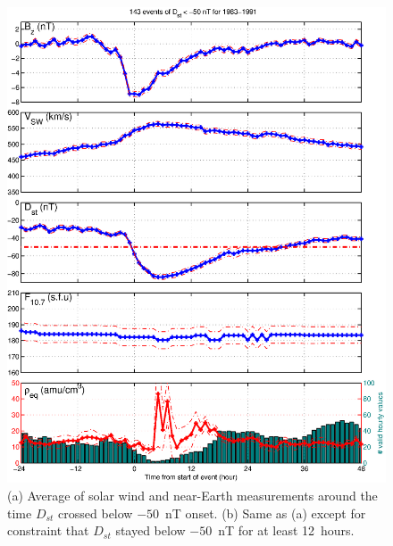 \documentclass[10pt,twocolumn]{article}
\begin{document}
\begin{figure}[tp!]
\includegraphics[scale=0.40]{paperfigures/stormavs-dd12.eps}
\caption{(a) Average of solar wind and near-Earth measurements around the time $D_{st}$ crossed below $-50$~nT onset. (b) Same as (a) except for constraint that $D_{st}$ stayed below $-50$~nT for at least 12~hours.}
\label{Storms}
\end{figure}

\clearpage
\end{document}
